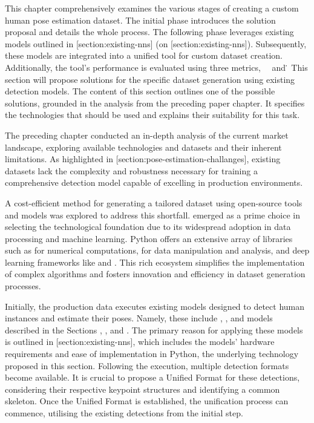 This chapter comprehensively examines the various stages of creating a custom human pose estimation dataset. The initial phase introduces the solution proposal and details the whole process. The following phase leverages existing models outlined in [section:existing-nns] (on [section:existing-nns]). Subsequently, these models are integrated into a unified tool for custom dataset creation. Additionally, the tool's performance is evaluated using three metrics, \OKS\, \APE\ and \MSE\.

This section will propose solutions for the specific dataset generation using existing \pojem{\NN} detection models. The content of this section outlines one of the possible solutions, grounded in the analysis from the preceding paper chapter. It specifies the technologies that should be used and explains their suitability for this task.

The preceding chapter conducted an in-depth analysis of the current market landscape, exploring available technologies and datasets and their inherent limitations. As highlighted in [section:pose-estimation-challanges], existing datasets lack the complexity and robustness necessary for training a comprehensive detection model capable of excelling in production environments.

A cost-efficient method for generating a tailored dataset using open-source tools and models was explored to address this shortfall.  emerged as a prime choice in selecting the technological foundation due to its widespread adoption in data processing and machine learning. Python offers an extensive array of libraries such as  for numerical computations,  for data manipulation and analysis, and deep learning frameworks like  and . This rich ecosystem simplifies the implementation of complex algorithms and fosters innovation and efficiency in dataset generation processes.

Initially, the production data executes existing models designed to detect human instances and estimate their poses. Namely, these include , , and  models described in the Sections , , and . The primary reason for applying these models is outlined in [section:existing-nns], which includes the models' hardware requirements and ease of implementation in Python, the underlying technology proposed in this section. Following the execution, multiple detection formats become available. It is crucial to propose a Unified Format for these detections, considering their respective keypoint structures and identifying a common skeleton. Once the Unified Format is established, the unification process can commence, utilising the existing detections from the initial step.

